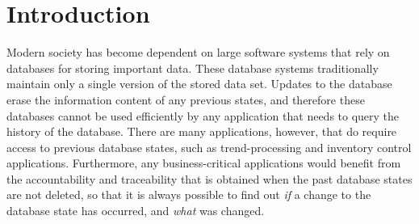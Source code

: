 \chapter{Introduction}
\label{chapter:introduction}




Modern society has become dependent on large software systems that
rely on databases for storing important data.
These database systems traditionally maintain only a single version of the
stored data set. 
Updates to the database erase the information content of any
previous states, and therefore these databases cannot be
used efficiently by any application that needs to query the history
of the database.
There are many applications, however, that do require access to
previous database states, such as trend-processing and inventory control
applications.
Furthermore, any business-critical applications would benefit from the
accountability and traceability that is obtained when the past database
states are not deleted, so that it is always possible to find out
\emph{if} a change to the database state has occurred, and \emph{what} was
changed.


